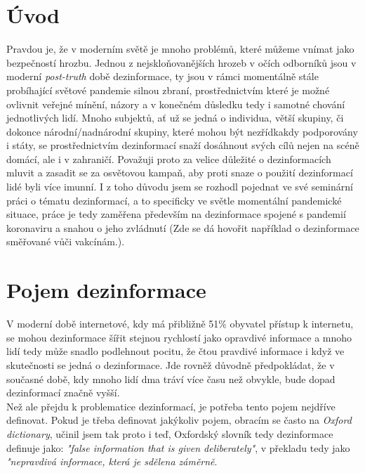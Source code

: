 \section*{Úvod}
Pravdou je, že v moderním světě je mnoho problémů, které můžeme vnímat jako bezpečností hrozbu. Jednou z nejskloňovanějších hrozeb v očích odborníků jsou v moderní \textit{post-truth} době dezinformace, ty jsou v rámci momentálně stále probíhající světové pandemie silnou zbraní, prostřednictvím které je možné ovlivnit veřejné mínění, názory a v konečném důsledku tedy i samotné chování jednotlivých lidí. Mnoho subjektů, ať už se jedná o individua, větší skupiny, či dokonce národní/nadnárodní skupiny, které mohou být nezřídkakdy podporovány i státy, se prostřednictvím dezinformací snaží dosáhnout svých cílů nejen na scéně domácí, ale i v zahraničí. Považuji proto za velice důležité o dezinformacích mluvit a zasadit se za osvětovou kampaň, aby proti snaze o použití dezinformací lidé byli více imunní. I z toho důvodu jsem se rozhodl pojednat ve své seminární práci o tématu dezinformací, a to specificky ve světle momentální pandemické situace, práce je tedy zaměřena především na dezinformace spojené s pandemií koronaviru a snahou o jeho zvládnutí (Zde se dá hovořit například o dezinformace směřované vůči vakcínám.).

\section{Pojem dezinformace}

V moderní době internetové, kdy má přibližně 51\% obyvatel přístup k internetu\cite{noauthor_individuals_nodate}, se mohou dezinformace šířit stejnou rychlostí jako opravdivé informace a mnoho lidí tedy může snadlo podlehnout pocitu, že čtou pravdivé informace i když ve skutečnosti se jedná o dezinformace. Jde rovněž důvodně předpokládat, že v současné době, kdy mnoho lidí dma tráví více času než obvykle, bude dopad dezinformací značně vyšší.\\

Než ale přejdu k problematice dezinformací, je potřeba tento pojem nejdříve definovat. Pokud je třeba definovat jakýkoliv pojem, obracím se často na \textit{Oxford dictionary}, učinil jsem tak proto i teď, Oxfordský slovník tedy dezinformace definuje jako: \textit{"false information that is given deliberately"}\cite{noauthor_disinformation_nodate}, v překladu tedy jako \textit{"nepravdivá informace, která je sdělena záměrně}.\\


